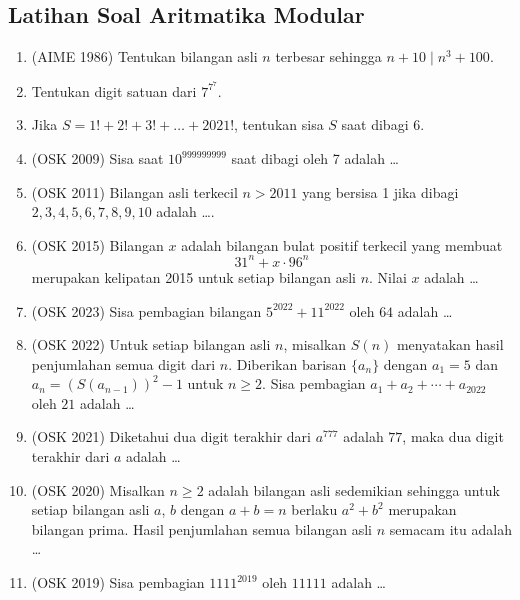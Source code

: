 \subsection{Latihan Soal Aritmatika Modular}
\begin{enumerate}    
    \item (AIME 1986) Tentukan bilangan asli $n$ terbesar sehingga $n+10 \mid n^3+100$.
    
    \item Tentukan digit satuan dari $7^{7^7}$.
    
    \item Jika $S=1!+2!+3!+\dots+2021!$, tentukan sisa $S$ saat dibagi 6.
    
    \item (OSK 2009) Sisa saat $10^{999999999}$ saat dibagi oleh 7 adalah \dots
    
    \item (OSK 2011) Bilangan asli terkecil $n>2011$ yang bersisa 1 jika dibagi $2,3,4,5,6,7,8,9,10$ adalah \dots.

    \item (OSK 2015) Bilangan $x$ adalah bilangan bulat positif terkecil yang membuat
    \[31^n + x \cdot 96^n\]
    merupakan kelipatan 2015 untuk setiap bilangan asli $n$. Nilai $x$ adalah \ldots

    \item (OSK 2023) Sisa pembagian bilangan $5^{2022}+11^{2022}$ oleh $64$ adalah \ldots

    \item (OSK 2022) Untuk setiap bilangan asli $n$, misalkan $S(n)$ menyatakan hasil penjumlahan semua digit dari $n$. Diberikan barisan $\{a_n\}$ dengan $a_1 = 5$ dan $a_n = (S(a_{n-1}))^2 - 1$ untuk $n \geq 2$. Sisa pembagian $a_1 + a_2 + \cdots + a_{2022}$ oleh $21$ adalah \ldots
    
    \item (OSK 2021) Diketahui dua digit terakhir dari $a^{777}$ adalah $77$, maka dua digit terakhir dari $a$ adalah \ldots

    \item (OSK 2020) Misalkan $n \geq 2$ adalah bilangan asli sedemikian sehingga untuk setiap bilangan asli $a$, $b$ dengan $a + b = n$ berlaku $a^2 + b^2$ merupakan bilangan prima. Hasil penjumlahan semua bilangan asli $n$ semacam itu adalah \ldots

    \item (OSK 2019) Sisa pembagian $1111^{2019}$ oleh $11111$ adalah \ldots
\end{enumerate}